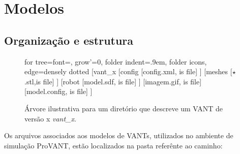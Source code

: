 
%

\chapter{Modelos}

\section{Organização e estrutura}


\begin{tiny}
	\begin{figure}[H]
		\begin{forest}
			for tree={font=\sffamily, grow'=0,
				folder indent=.9em, folder icons,
				edge=densely dotted}
			[vant\_x
			[config
			[config.xml, is file]  
			]
			[meshes
			[$\star$.stl,is file]
			]  
			[robot
			[model.sdf, is file]
			]
			[imagem.gif, is file]
			[model.config, is file]
			]
		\end{forest}
		\caption{Árvore ilustrativa para um diretório que descreve um VANT de versão x \emph{vant\_x}.}
		\label{fig:arvore_vantx}
	\end{figure}
\end{tiny}


Os arquivos associados aos modelos de VANTs, utilizados no ambiente de simulação ProVANT, estão localizados na pasta referênte ao caminho:



